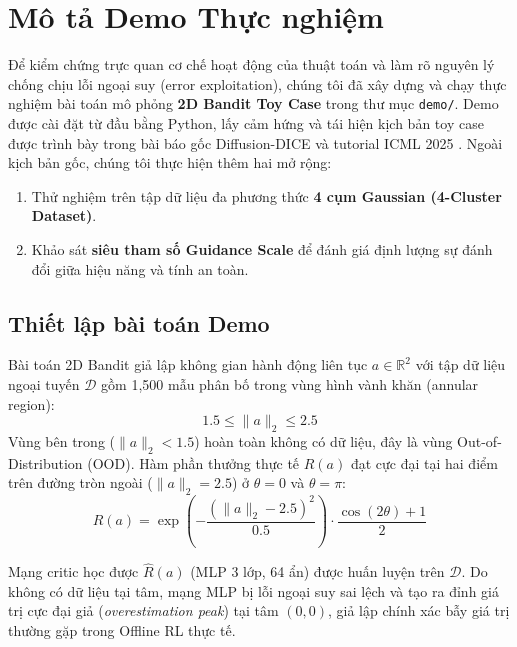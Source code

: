 \section{Mô tả Demo Thực nghiệm}
\label{sec:demo_description}

Để kiểm chứng trực quan cơ chế hoạt động của thuật toán và làm rõ nguyên lý chống chịu lỗi ngoại suy (error exploitation), chúng tôi đã xây dựng và chạy thực nghiệm bài toán mô phỏng \textbf{2D Bandit Toy Case} trong thư mục \texttt{demo/}. Demo được cài đặt từ đầu bằng Python, lấy cảm hứng và tái hiện kịch bản toy case được trình bày trong bài báo gốc Diffusion-DICE \cite{mao2024diffusiondice} và tutorial ICML 2025 \cite{eysenbach2025tutorial}. Ngoài kịch bản gốc, chúng tôi thực hiện thêm hai mở rộng:

\begin{enumerate}
    \item Thử nghiệm trên tập dữ liệu đa phương thức \textbf{4 cụm Gaussian (4-Cluster Dataset)}.
    \item Khảo sát \textbf{siêu tham số Guidance Scale} để đánh giá định lượng sự đánh đổi giữa hiệu năng và tính an toàn.
\end{enumerate}

\subsection{Thiết lập bài toán Demo}
Bài toán 2D Bandit giả lập không gian hành động liên tục $a \in \mathbb{R}^2$ với tập dữ liệu ngoại tuyến $\mathcal{D}$ gồm 1,500 mẫu phân bố trong vùng hình vành khăn (annular region):
$$1.5 \leq \|a\|_2 \leq 2.5$$
Vùng bên trong ($\|a\|_2 < 1.5$) hoàn toàn không có dữ liệu, đây là vùng Out-of-Distribution (OOD). Hàm phần thưởng thực tế $R(a)$ đạt cực đại tại hai điểm trên đường tròn ngoài ($\|a\|_2 = 2.5$) ở $\theta = 0$ và $\theta = \pi$:
$$R(a) = \exp\!\left(-\frac{(\|a\|_2 - 2.5)^2}{0.5}\right) \cdot \frac{\cos(2\theta) + 1}{2}$$

Mạng critic học được $\hat{R}(a)$ (MLP 3 lớp, 64 ẩn) được huấn luyện trên $\mathcal{D}$. Do không có dữ liệu tại tâm, mạng MLP bị lỗi ngoại suy sai lệch và tạo ra đỉnh giá trị cực đại giả (\textit{overestimation peak}) tại tâm $(0,0)$, giả lập chính xác bẫy giá trị thường gặp trong Offline RL thực tế.

